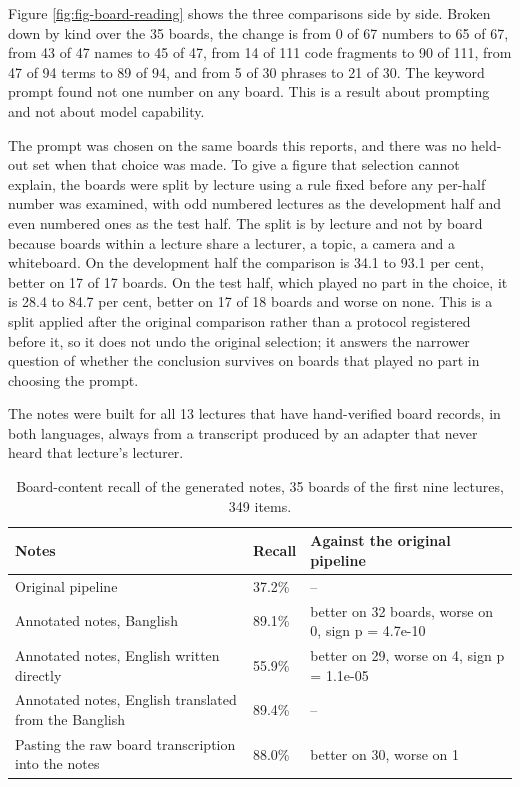 Figure \ref{fig:fig-board-reading} shows the three comparisons side by side.
Broken down by kind over the 35 boards, the change is from 0 of 67 numbers to 65 of 67,
from 43 of 47 names to 45 of 47, from 14 of 111 code fragments to 90 of 111, from 47 of 94
terms to 89 of 94, and from 5 of 30 phrases to 21 of 30. The keyword prompt found not one
number on any board. This is a result about prompting and not about model capability.

The prompt was chosen on the same boards this reports, and there was no held-out set when
that choice was made. To give a figure that selection cannot explain, the boards were
split by lecture using a rule fixed before any per-half number was examined, with odd
numbered lectures as the development half and even numbered ones as the test half. The
split is by lecture and not by board because boards within a lecture share a lecturer,
a topic, a camera and a whiteboard. On the development half the comparison is 34.1 to 93.1
per cent, better on 17 of 17 boards. On the test half, which played no part in the choice,
it is 28.4 to 84.7 per cent, better on 17 of 18 boards and worse on none. This is a split
applied after the original comparison rather than a protocol registered before it, so it
does not undo the original selection; it answers the narrower question of whether the
conclusion survives on boards that played no part in choosing the prompt.

The notes were built for all 13 lectures that have hand-verified board records, in both
languages, always from a transcript produced by an adapter that never heard that lecture's
lecturer.

\begin{table}[htbp]
\centering
\caption{Board-content recall of the generated notes, 35 boards of the first nine
lectures, 349 items.}
\label{tab:notes}
\small
\begin{tabular}{p{6.2cm}p{2.0cm}p{5.2cm}}
\toprule
Notes & Recall & Against the original pipeline \\
\midrule
Original pipeline & 37.2\% & -- \\
Annotated notes, Banglish & 89.1\% &
better on 32 boards, worse on 0, sign p = 4.7e-10 \\
Annotated notes, English written directly & 55.9\% &
better on 29, worse on 4, sign p = 1.1e-05 \\
Annotated notes, English translated from the Banglish & 89.4\% & -- \\
Pasting the raw board transcription into the notes & 88.0\% &
better on 30, worse on 1 \\
\bottomrule
\end{tabular}
\end{table}

